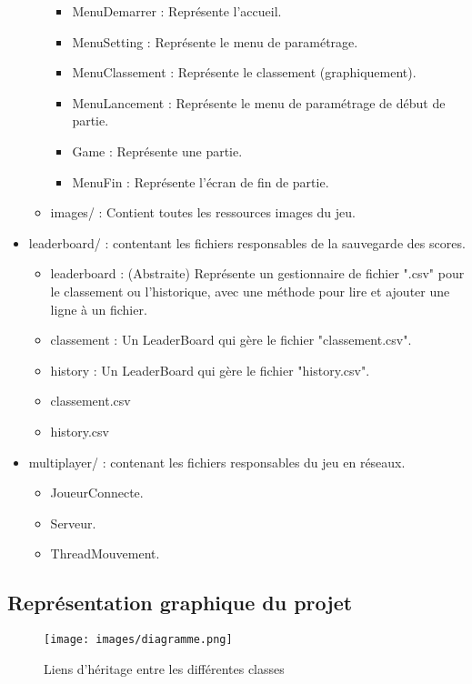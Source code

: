 \documentclass{article}
\begin{document}
\begin{itemize}
\begin{itemize}
\begin{itemize}
            \item MenuDemarrer : Représente l'accueil.
            \item MenuSetting : Représente le menu de paramétrage.
            \item MenuClassement : Représente le classement (graphiquement).
            \item MenuLancement : Représente le menu de paramétrage de début de partie.
            \item Game : Représente une partie.
            \item MenuFin : Représente l'écran de fin de partie.
        \end{itemize}
        \item images/ : Contient toutes les ressources images du jeu.
    \end{itemize}
    \item leaderboard/ : contentant les fichiers responsables de la sauvegarde des scores.
    \begin{itemize}
        \item leaderboard : (Abstraite) Représente un gestionnaire de fichier ".csv" pour le classement ou l'historique, avec une méthode pour lire et ajouter une ligne à un fichier.
        \item classement : Un LeaderBoard qui gère le fichier "classement.csv".
        \item history : Un LeaderBoard qui gère le fichier "history.csv".
        \item classement.csv
        \item history.csv
    \end{itemize}
    \item multiplayer/ : contenant les fichiers responsables du jeu en réseaux.
    \begin{itemize}
        \item JoueurConnecte.
        \item Serveur.
        \item ThreadMouvement.
    \end{itemize}
\end{itemize}

\subsection{Représentation graphique du projet}
\begin{figure}[h]
        \centerline{\texttt{[image: images/diagramme.png]}}
        \caption{Liens d'héritage entre les différentes classes}
\end{figure}
\end{document}

